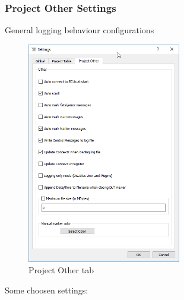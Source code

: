 \documentclass[a4paper,11pt]{article}
\begin{document}
\subsubsection{Project Other Settings}

General logging behaviour configurations

\begin{figure}[H]
 \centering
 \includegraphics[width=0.6\textwidth]{images/settings_other.png}
 \caption{Project Other tab}
 \label{fig:projectotherab}
\end{figure}

Some choosen settings:
\end{document}
